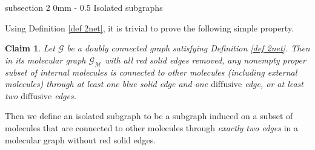 \documentclass{article}
\makeatletter
\newcommand{\1}{\mathds{1}}
\numberwithin{equation}{section}
\renewcommand{\cal}{\mathcal}
\newcommand{\dashed}{\text{diffusive}}
\theoremstyle{plain} %
\newtheorem{claim}[theorem]{Claim}
\theoremstyle{remark}
\renewcommand{\subsection}{\@startsection
	{subsection}%
	{2}%
	{0mm}%
	{-\baselineskip}%
	{0.5\baselineskip}%
	{\normalfont\bf\itshape}} %
\makeatother
\begin{document}
 

\subsection{Isolated subgraphs}

Using Definition \ref{def 2net}, it is trivial to prove the following simple property. 
 
\begin{claim}\label{trivial_claim1}
Let $\cal G$ be a doubly connected graph satisfying Definition \ref{def 2net}. Then in its molecular graph $\cal G_{\cal M}$ with all red solid edges removed, any nonempty proper subset of internal molecules is connected to other molecules (including external molecules) through at least one blue solid edge and one $\dashed$ edge, or at least two $\dashed$ edges. 
\end{claim}

Then we define an isolated subgraph to be a subgraph induced on a subset of molecules that are connected to other molecules through \emph{exactly two edges} in a molecular graph without red solid edges. 
\end{document}
